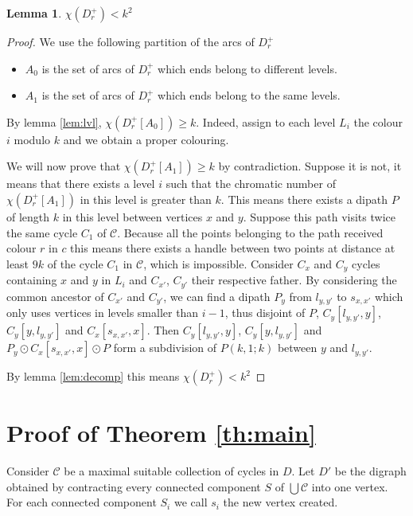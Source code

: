 \documentclass[utf8,11pt]{article}
\theoremstyle{plain}
\newtheorem{lemma}[theorem]{Lemma}
\theoremstyle{definition}
\theoremstyle{remark}
\newcommand{\dr}{ k^2}
\begin{document}
\begin{lemma}
$\chi(D_r^+) < \dr$
\end{lemma}

\begin{proof}
We use the following partition of the arcs of $D_r^+$

\begin{itemize}
	\item $A_0$ is the set of arcs of $D_r^+$ which ends belong to different levels.
	\item $A_1$ is the set of arcs of $D_r^+$ which ends belong to the same levels.
\end{itemize} 

By lemma \ref{lem:lvl}, $\chi(D_r^+[A_0]) \geq k$. Indeed, assign to each level $L_i$ the colour $i$ modulo $k$ and
we obtain a proper colouring.

We will now prove that $\chi(D_r^+[A_1]) \geq k$ by contradiction. 
Suppose it is not, it means that there exists a level $i$ such that the chromatic number of $\chi(D_r^+[A_1])$ in this level is greater 
than $k$. This means there exists a dipath $P$ of length $k$ in this level between vertices $x$ and $y$. Suppose this path visits twice 
the same cycle $C_1$ of $\mathcal{C}$. Because all the points belonging to the path received colour $r$ in $c$ this means there exists a 
handle between two points at distance at least $9k$ of the cycle $C_1$ in $\mathcal{C}$, which is impossible. 
Consider $C_x$ and $C_y$ cycles containing $x$ and $y$ in $L_i$ and $C_{x'}$, $C_{y'}$ their respective father. 
By considering the common ancestor of $C_{x'}$ and $C_{y'}$, we can find a dipath $P_y$ from $l_{y,y'}$ to $s_{x,x'}$ which 
only uses vertices in levels smaller than $i-1$, thus disjoint of $P$, $C_y[l_{y,y'}, y]$, $C_y[y, l_{y,y'}]$ and $C_x[s_{x,x'}, x]$. 
Then $C_y[l_{y,y'}, y]$, $C_y[y, l_{y,y'}]$ and $P_y \odot C_x[s_{x,x'}, x] \odot P$ form a subdivision of $P(k,1;k)$ between $y$ 
and $l_{y,y'}$. 

By lemma \ref{lem:decomp} this means $\chi(D_r^+) <  \dr$ 

\end{proof}

\section{Proof of Theorem \ref{th:main}}

Consider $\mathcal{C}$ be a maximal suitable collection of cycles in $D$. Let $D'$ be the digraph obtained by contracting 
every connected component $S$ of $\bigcup \mathcal{C}$ into one vertex. For each connected component $S_i$ we call $s_i$ the
new vertex created.
\end{document}
